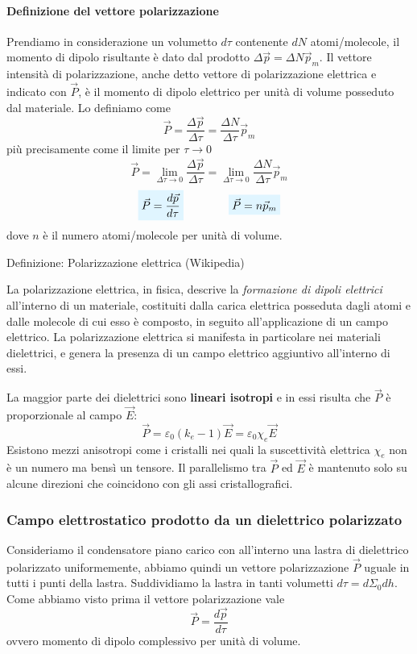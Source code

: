 \documentclass[x11names]{report}
\newcommand{\definizione}[2]{
	\begin{center}
		\fboxsep11pt
		\colorbox{myblue}{\begin{minipage}{5.75in}
				\begin{blues}{Definizione: #1}
					#2
				\end{blues}
		\end{minipage}}
	\end{center}
}
\newcommand{\viola}[1]{%
	\colorbox{myblue}{$\displaystyle #1$}
}
\begin{document}
\paragraph*{Definizione del vettore polarizzazione}
Prendiamo in considerazione un volumetto \(d\tau\) contenente \(dN\) atomi/molecole, il momento di dipolo risultante è dato dal prodotto \(\Delta\vec{p} = \Delta N \vec{p}_m\).  Il vettore intensità di polarizzazione, anche detto vettore di polarizzazione elettrica e indicato con \(\vec{P}\), è il momento di dipolo elettrico per unità di volume posseduto dal materiale. Lo definiamo come
\[
\vec{P} =\frac{\Delta \vec{p}}{\Delta\tau} = \frac{\Delta N}{\Delta \tau}\vec{p}_m
\]
più precisamente come il limite per \(\tau \to 0\)
\[
\vec{P} = \lim_{\Delta\tau\to 0}\frac{\Delta \vec{p}}{\Delta\tau} = \lim_{\Delta\tau\to 0}\frac{\Delta N}{\Delta \tau}\vec{p}_m
\]
\begin{equation}
\viola{\vec{P}= \frac{d \vec{p}}{d\tau}} \qquad \qquad	\viola{\vec{P} = n\vec{p}_m}
\end{equation}
dove \(n\) è il numero atomi/molecole per unità di volume. 
\definizione{Polarizzazione elettrica (Wikipedia)}{
La polarizzazione elettrica, in fisica, descrive la \textit{formazione di dipoli elettrici} all'interno di un materiale, costituiti dalla carica elettrica posseduta dagli atomi e dalle molecole di cui esso è composto, in seguito all'applicazione di un campo elettrico. La polarizzazione elettrica si manifesta in particolare nei materiali dielettrici, e genera la presenza di un campo elettrico aggiuntivo all'interno di essi.}


La maggior parte dei dielettrici sono \textbf{lineari isotropi} e in essi risulta che \(\vec{P}\) è proporzionale al campo \(\vec{E}\):
\[
\vec{P} = \varepsilon_0(k_e -1)\vec{E} = \varepsilon_0 \chi_e \vec{E}
\]
Esistono mezzi anisotropi come i cristalli nei quali la suscettività elettrica \(\chi_e\) non è un numero ma bensì un tensore. Il parallelismo tra \(\vec{P}\) ed \(\vec{E}\) è mantenuto solo su alcune direzioni che coincidono con gli assi cristallografici.

\subsubsection{Campo elettrostatico prodotto da un dielettrico polarizzato}
Consideriamo il condensatore piano carico con all'interno una lastra di dielettrico polarizzato uniformemente, abbiamo quindi un vettore polarizzazione \(\vec{P}\) uguale in tutti i punti della lastra. Suddividiamo la lastra in tanti volumetti \(d\tau = d\Sigma_0 dh\). Come abbiamo visto prima il vettore polarizzazione vale
\[
\vec{P} = \frac{d\vec{p}}{d\tau}
\]
ovvero momento di dipolo complessivo per unità di volume.
\end{document}
